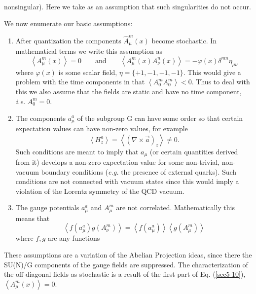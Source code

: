 \documentclass[a4paper,aps,showpacs]{revtex4}
\begin{document}
nonsingular). Here we take as an assumption that such singularities
do not occur.
\par
We now enumerate our basic assumptions:
\begin{enumerate}
  \item
  After quantization the components $\hat A^m_\mu (x)$
  become stochastic. In mathematical terms we write this
  assumption as
\begin{equation}
  \left\langle A^m_\mu (x) \right\rangle = 0
  \qquad \text{and} \qquad
  \left\langle
  A^m_\mu (x) A^n_\nu (x) \right\rangle =
  - \varphi (x) \delta ^{mn} \eta _{\mu\nu}
  \label{sec5-10}
\end{equation}
  where $\varphi (x)$ is some scalar field,
  $\eta = \{ +1, -1, -1, -1 \}$. This would give a problem with
  the time components in that $\left\langle A^m_0 A^m_0 \right\rangle < 0$.
  Thus to deal with this we also assume that the fields are static and
  have no time component, {\it i.e.} $A^m_0 = 0$.
  \item
  The components $a^a_\mu$ of the subgroup G can have some order so that
  certain expectation values can have non-zero values, for example
\begin{equation}
  \left\langle H^a_z \right\rangle =
  \left\langle (\nabla \times \vec{a})_z  \right\rangle \neq 0 .
\label{sec5-20}
\end{equation}
   Such conditions are meant to imply that $a_{\mu}$ (or
   certain quantities derived from it) develops a non-zero
   expectation value for some non-trivial, non-vacuum
   boundary conditions ({\it e.g.} the presence of external
   quarks). Such conditions are not connected with vacuum states
   since this would imply a violation of the Lorentz symmetry
   of the QCD vacuum.
  \item
  The gauge potentials $a^a_\mu$ and $A^m_\mu$ are not correlated.
  Mathematically this means that
\begin{equation}
  \left\langle f(a^a_\mu) g(A^m_\nu) \right\rangle =
  \left\langle f(a^a_\mu) \right\rangle
  \left\langle g(A^m_\mu) \right\rangle
\label{sec5-30}
\end{equation}
  where $f,g$ are any functions
\end{enumerate}
These assumptions are a variation of the Abelian Projection
ideas, since there the SU(N)/G components of the gauge fields
are suppressed. The characterization of the off-diagonal fields
as stochastic is a result of the first part of Eq.
(\ref{sec5-10}), $\left\langle A^m_\mu (x) \right\rangle = 0$.
\end{document}
